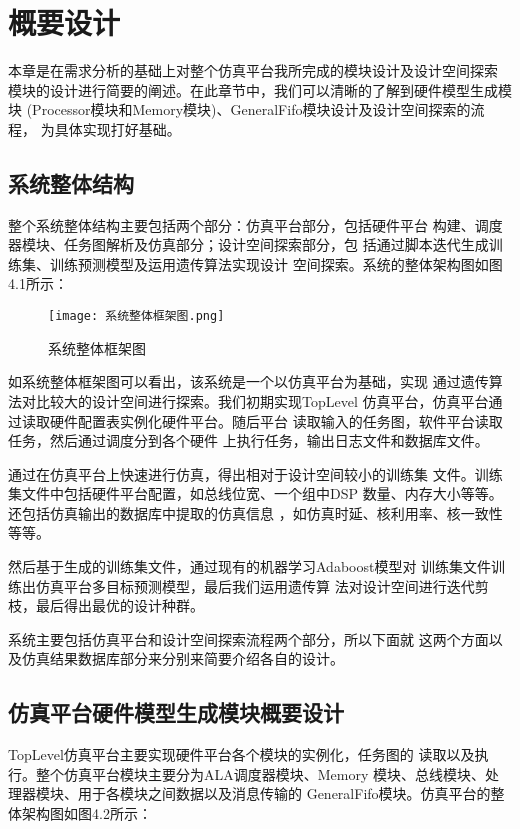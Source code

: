 
\chapter{概要设计}
本章是在需求分析的基础上对整个仿真平台我所完成的模块设计及设计空间探索
模块的设计进行简要的阐述。在此章节中，我们可以清晰的了解到硬件模型生成模块
(Processor模块和Memory模块)、GeneralFifo模块设计及设计空间探索的流程，
为具体实现打好基础。

\section{系统整体结构}
整个系统整体结构主要包括两个部分：仿真平台部分，包括硬件平台
构建、调度器模块、任务图解析及仿真部分；设计空间探索部分，包
括通过脚本迭代生成训练集、训练预测模型及运用遗传算法实现设计
空间探索。系统的整体架构图如图4.1所示：

\begin{figure}[h]
    \centering
    \texttt{[image: 系统整体框架图.png]}
    \caption{系统整体框架图}
    \label{fig:badge}
\end{figure}

如系统整体框架图可以看出，该系统是一个以仿真平台为基础，实现
通过遗传算法对比较大的设计空间进行探索。我们初期实现TopLevel
仿真平台，仿真平台通过读取硬件配置表实例化硬件平台。随后平台
读取输入的任务图，软件平台读取任务，然后通过调度分到各个硬件
上执行任务，输出日志文件和数据库文件。

通过在仿真平台上快速进行仿真，得出相对于设计空间较小的训练集
文件。训练集文件中包括硬件平台配置，如总线位宽、一个组中DSP
数量、内存大小等等。还包括仿真输出的数据库中提取的仿真信息
，如仿真时延、核利用率、核一致性等等。

然后基于生成的训练集文件，通过现有的机器学习Adaboost模型\cite{29}对
训练集文件训练出仿真平台多目标预测模型\cite{30}，最后我们运用遗传算
法对设计空间进行迭代剪枝，最后得出最优的设计种群。

系统主要包括仿真平台和设计空间探索流程两个部分，所以下面就
这两个方面以及仿真结果数据库部分来分别来简要介绍各自的设计。

\section{仿真平台硬件模型生成模块概要设计}
TopLevel仿真平台主要实现硬件平台各个模块的实例化，任务图的
读取以及执行。整个仿真平台模块主要分为ALA调度器模块、Memory
模块、总线模块、处理器模块、用于各模块之间数据以及消息传输的
GeneralFifo模块。仿真平台的整体架构图如图4.2所示：

